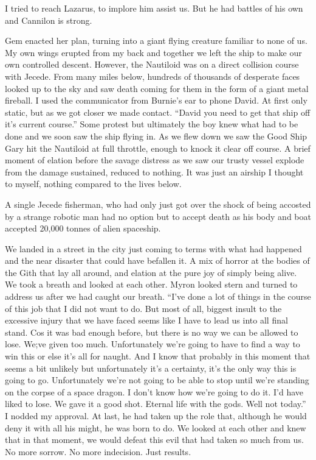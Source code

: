I tried to reach Lazarus, to implore him assist us. But he had battles of his own and Cannilon is strong.\medskip

Gem enacted her plan, turning into a giant flying creature familiar to none of us. My own wings erupted from my back and together we left the ship to make our own controlled descent. However, the Nautiloid was on a direct collision course with Jecede. From many miles below, hundreds of thousands of desperate faces looked up to the sky and saw death coming for them in the form of a giant metal fireball. I used the communicator from Burnie’s ear to phone David. At first only static, but as we got closer we made contact. “David you need to get that ship off it’s current course.” Some protest but ultimately the boy knew what had to be done and we soon saw the ship flying in. As we flew down we saw the Good Ship Gary hit the Nautiloid at full throttle, enough to knock it clear off course. A brief moment of elation before the savage distress as we saw our trusty vessel explode from the damage sustained, reduced to nothing. It was just an airship I thought to myself, nothing compared to the lives below.\medskip

A single Jecede fisherman, who had only just got over the shock of being accosted by a strange robotic man had no option but to accept death as his body and boat accepted 20,000 tonnes of alien spaceship.\medskip

We landed in a street in the city just coming to terms with what had happened and the near disaster that could have befallen it. A mix of horror at the bodies of the Gith that lay all around, and elation at the pure joy of simply being alive. We took a breath and looked at each other. Myron looked stern and turned to address us after we had caught our breath. “I’ve done a lot of things in the course of this job that I did not want to do. But most of all, biggest insult to the excessive injury that we have faced seems like I have to lead us into all final stand. Cos it was bad enough before, but there is no way we can be allowed to lose. We;ve given too much. Unfortunately we’re going to have to find a way to win this or else it’s all for naught. And I know that probably in this moment that seems a bit unlikely but unfortunately it’s a certainty, it’s the only way this is going to go. Unfortunately we’re not going to be able to stop until we’re standing on the corpse of a space dragon. I don’t know how we’re going to do it. I’d have liked to lose. We gave it a good shot. Eternal life with the gods. Well not today.” I nodded my approval. At last, he had taken up the role that, although he would deny it with all his might, he was born to do. We looked at each other and knew that in that moment, we would defeat this evil that had taken so much from us. No more sorrow. No more indecision. Just results.\medskip

